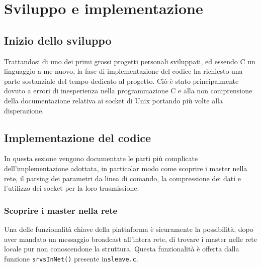 \documentclass[11pt,fleqn]{book} %
\begin{document}

\chapter{Sviluppo e implementazione}

\section{Inizio dello sviluppo}
Trattandosi di uno dei primi grossi progetti personali sviluppati, ed essendo C un linguaggio a me nuovo, la fase di implementazione del codice ha richiesto una parte sostanziale del tempo dedicato al progetto.
Ciò è stato principalmente dovuto a errori di inesperienza nella programmazione C e alla non comprensione della documentazione relativa ai socket di Unix portando più volte alla disperazione.


\section{Implementazione del codice}
In questa sezione vengono documentate le parti più complicate dell'implementazione adottata, in particolar modo come scoprire i master nella rete, il parsing dei parametri da linea di comando, la compressione dei dati e l'utilizzo dei socket per la loro trasmissione.

\subsection{Scoprire i master nella rete}
Una delle funzionalità chiave della piattaforma è sicuramente la possibilità, dopo aver mandato un messaggio broadcast all'intera rete, di trovare i master nelle rete locale pur non conoscendone la struttura. Questa funzionalità è offerta dalla funzione \texttt{srvsInNet()} presente in\texttt{sleave.c}.
\end{document}
